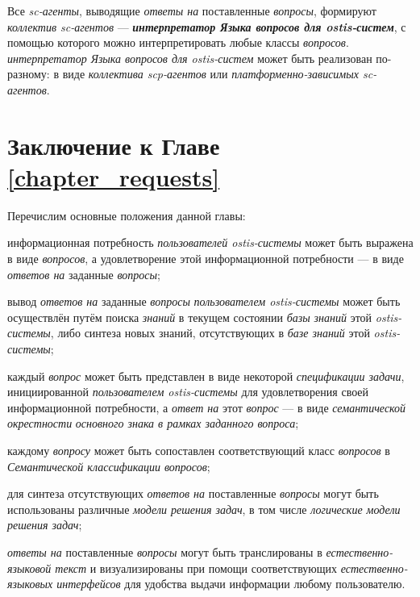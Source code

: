 Все \textit{sc-агенты}, выводящие \textit{ответы на} поставленные \textit{вопросы}, формируют \textit{коллектив sc-агентов} --- \textbf{\textit{интерпретатор Языка вопросов для ostis-систем}}, с помощью которого можно интерпретировать любые классы \textit{вопросов}. \textit{интерпретатор Языка вопросов для ostis-систем} может быть реализован по-разному: в виде \textit{коллектива scp-агентов} или \textit{платформенно-зависимых sc-агентов}.

\section*{Заключение к Главе \ref{chapter_requests}}

Перечислим основные положения данной главы:
\begin{textitemize}
	\item информационная потребность \textit{пользователей ostis-системы} может быть выражена в виде \textit{вопросов}, а удовлетворение этой информационной потребности --- в виде \textit{ответов на} заданные \textit{вопросы};
	\item вывод \textit{ответов на} заданные \textit{вопросы} \textit{пользователем ostis-системы} может быть осуществлён путём поиска \textit{знаний} в текущем состоянии \textit{базы знаний} этой \textit{ostis-системы}, либо синтеза новых знаний, отсутствующих в \textit{базе знаний} этой \textit{ostis-системы};
	\item каждый \textit{вопрос} может быть представлен в виде некоторой \textit{спецификации задачи}, инициированной \textit{пользователем ostis-системы} для удовлетворения своей информационной потребности, а \textit{ответ на} этот \textit{вопрос} --- в виде \textit{семантической окрестности} \textit{основного знака в рамках заданного вопроса};
	\item каждому \textit{вопросу} может быть сопоставлен соответствующий класс \textit{вопросов} в \textit{Семантической классификации вопросов};
	\item для синтеза отсутствующих \textit{ответов на} поставленные \textit{вопросы} могут быть использованы различные \textit{модели решения задач}, в том числе \textit{логические модели решения задач};
	\item \textit{ответы на} поставленные \textit{вопросы} могут быть транслированы в \textit{естественно-языковой текст} и визуализированы при помощи соответствующих \textit{естественно-языковых интерфейсов} для удобства выдачи информации любому пользователю.
\end{textitemize}

%